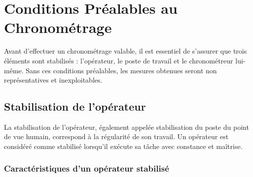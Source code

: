 \documentclass[a4paper,12pt]{article}
\begin{document}
\begin{center}
\end{center}


\section{Conditions Préalables au Chronométrage}

Avant d'effectuer un chronométrage valable, il est essentiel de s'assurer que trois éléments sont stabilisés : l'opérateur, le poste de travail et le chronométreur lui-même. Sans ces conditions préalables, les mesures obtenues seront non représentatives et inexploitables.

\subsection{Stabilisation de l'opérateur}

La stabilisation de l'opérateur, également appelée stabilisation du poste du point de vue humain, correspond à la régularité de son travail. Un opérateur est considéré comme stabilisé lorsqu'il exécute sa tâche avec constance et maîtrise.

\subsubsection{Caractéristiques d'un opérateur stabilisé}
\end{document}
